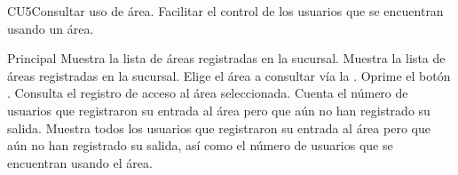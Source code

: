 
% 



	\begin{UseCase}{CU5}{Consultar uso de área.}{
		Facilitar el control de los usuarios que se encuentran usando un área.
	}
	\end{UseCase}

	\begin{UCtrayectoria}{Principal}
	\UCpaso Muestra la lista de áreas registradas en la sucursal.
		\UCpaso Muestra la lista de áreas registradas en la sucursal.
		\UCpaso[\UCactor] Elige el área a consultar vía la  \label{CU17Login}.
		\UCpaso[\UCactor] Oprime el botón .
		\UCpaso Consulta el registro de acceso al área seleccionada.
		\UCpaso Cuenta el número de usuarios que registraron su entrada al área pero que aún no han registrado su salida.
		\UCpaso Muestra todos los usuarios que registraron su entrada al área pero que aún no han registrado su salida, así como el número de usuarios que se encuentran usando el área.
		
		
	\end{UCtrayectoria}